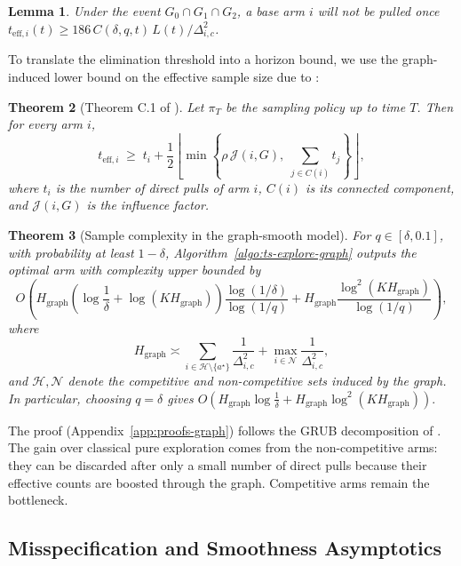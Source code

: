 \documentclass{article}
\newtheorem{theorem}{Theorem}
\newtheorem{lemma}[theorem]{Lemma}
\begin{document}
\begin{lemma}\label{lem:terminate-graph}
Under the event $G_0\cap G_1\cap G_2$, a base arm $i$ will not be pulled once
$t_{\mathrm{eff},i}(t)\ge 186\,C(\delta,q,t)\,L(t)/\Delta_{i,c}^2$.
\end{lemma}

To translate the elimination threshold into a horizon bound, we use the graph-induced lower bound on the effective sample size due to \cite{thaker2022maximizing}:

\begin{theorem}[Theorem C.1 of \cite{thaker2022maximizing}]
\label{thm:teff-lower}
Let $\pi_T$ be the sampling policy up to time $T$. Then for every arm $i$,
\begin{equation}
t_{\mathrm{eff},i}
\;\ge\;
t_i+\frac12\left\lfloor
\min\!\left\{\rho\,\mathcal J(i,G),\;\sum_{j\in C(i)} t_j\right\}
\right\rfloor,
\label{eq:teff-lower}
\end{equation}
where $t_i$ is the number of direct pulls of arm $i$, $C(i)$ is its connected component, and $\mathcal J(i,G)$ is the influence factor.
\end{theorem}

\begin{theorem}[Sample complexity in the graph-smooth model]
\label{thm:main-graph}
For $q\in[\delta,0.1]$, with probability at least $1-\delta$, Algorithm~\ref{algo:ts-explore-graph} outputs the optimal arm with complexity upper bounded by
\[
O\!\left(
H_{\mathrm{graph}}
\left(\log\frac1\delta+\log(KH_{\mathrm{graph}})\right)
\frac{\log(1/\delta)}{\log(1/q)}
+
H_{\mathrm{graph}}
\frac{\log^2(KH_{\mathrm{graph}})}{\log(1/q)}
\right),
\]
where
\[
H_{\mathrm{graph}}
\asymp
\sum_{i\in\mathcal H\setminus\{a^\star\}}\frac{1}{\Delta_{i,c}^2}
+
\max_{i\in\mathcal N}\frac{1}{\Delta_{i,c}^2},
\]
and $\mathcal H,\mathcal N$ denote the competitive and non-competitive sets induced by the graph.
In particular, choosing $q=\delta$ gives
$
O\!\left(
H_{\mathrm{graph}}\log\frac1\delta
+
H_{\mathrm{graph}}\log^2(KH_{\mathrm{graph}})
\right).
$
\end{theorem}

The proof (Appendix~\ref{app:proofs-graph}) follows the GRUB decomposition of \cite{thaker2022maximizing}. The gain over classical pure exploration comes from the non-competitive arms: they can be discarded after only a small number of direct pulls because their effective counts are boosted through the graph. Competitive arms remain the bottleneck.

\subsection{Misspecification and Smoothness Asymptotics}\label{sec:misspecified}
\end{document}
